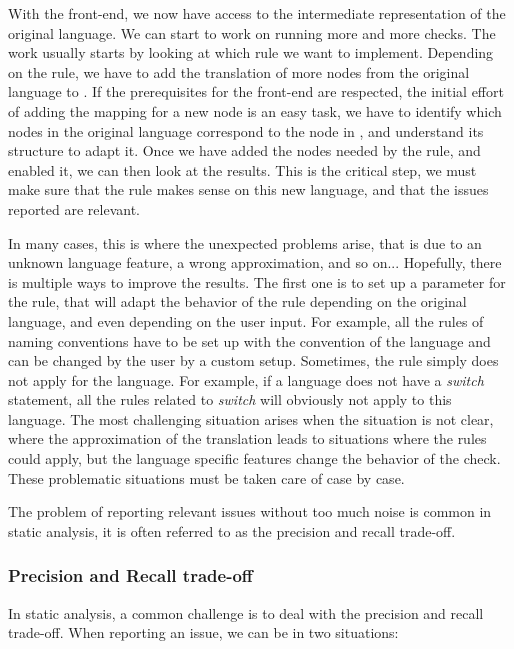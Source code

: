 With the front-end, we now have access to the intermediate representation of the original language. 
We can start to work on running more and more checks. 
The work usually starts by looking at which rule we want to implement. 
Depending on the rule, we have to add the translation of more nodes from the original language to \slang{}. 
If the prerequisites for the front-end are respected, the initial effort of adding the mapping for a new node is an easy task, we have to identify which nodes in the original language correspond to the node in \slang{}, and understand its structure to adapt it. 
Once we have added the nodes needed by the rule, and enabled it, we can then look at the results. 
This is the critical step, we must make sure that the rule makes sense on this new language, and that the issues reported are relevant. 

In many cases, this is where the unexpected problems arise, that is due to an unknown language feature, a wrong approximation, and so on...
Hopefully, there is multiple ways to improve the results. 
The first one is to set up a parameter for the rule, that will adapt the behavior of the rule depending on the original language, and even depending on the user input.
For example, all the rules of naming conventions have to be set up with the convention of the language and can be changed by the user by a custom setup. 
Sometimes, the rule simply does not apply for the language. 
For example, if a language does not have a \emph{switch} statement, all the rules related to \emph{switch} will obviously not apply to this language.
The most challenging situation arises when the situation is not clear, where the approximation of the translation leads to situations where the rules could apply, but the language specific features change the behavior of the check. 
These problematic situations must be taken care of case by case.

The problem of reporting relevant issues without too much noise is common in static analysis, it is often referred to as the precision and recall trade-off.

\subsubsection{Precision and Recall trade-off}
\label{subsubsec:precision_recall}

In static analysis, a common challenge is to deal with the precision and recall trade-off. When reporting an issue, we can be in two situations:

